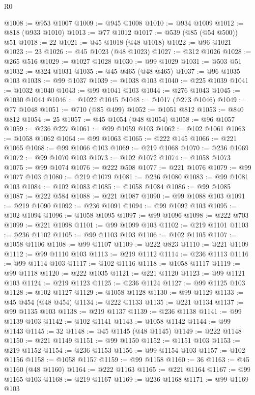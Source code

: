 \begin{lexlean}{R0}
\begin{coremodule}
@1008 := @953 @1007
@1009 := @945 @1008
@1010 := @934 @1009
@1012 := @818 (@933 @1010)
@1013 := @77 @1012
@1017 := @539 (@85 (@54 @500)) @51
@1018 := 22
@1021 := @45 @1018 (@48 @1018)
@1022 := @96 @1021
@1023 := 23
@1026 := @45 @1023 (@48 @1023)
@1027 := @312 @1026
@1028 := @265 @516
@1029 := @1027 @1028
@1030 := @99 @1029
@1031 := @503 @51
@1032 := @324 @1031
@1035 := @45 @465 (@48 @465)
@1037 := @96 @1035 @103
@1038 := @99 @1037
@1039 := @1038 @103
@1040 := @225 @1039
@1041 := @1032 @1040
@1043 := @99 @1041 @103
@1044 := @276 @1043
@1045 := @1030 @1044
@1046 := @1022 @1045
@1048 := @1017 (@273 @1046)
@1049 := @77 @1048
@1051 := @710 (@85 @499)
@1052 := @1051 @812
@1053 := @840 @812
@1054 := 25
@1057 := @45 @1054 (@48 @1054)
@1058 := @96 @1057
@1059 := @236 @227
@1061 := @99 @1059 @103
@1062 := @102 @1061
@1063 := @1058 @1062
@1064 := @99 @1063
@1065 := @222 @145
@1066 := @221 @1065
@1068 := @99 @1066 @103
@1069 := @219 @1068
@1070 := @236 @1069
@1072 := @99 @1070 @103
@1073 := @102 @1072
@1074 := @1058 @1073
@1075 := @99 @1074
@1076 := @222 @508
@1077 := @221 @1076
@1079 := @99 @1077 @103
@1080 := @219 @1079
@1081 := @236 @1080
@1083 := @99 @1081 @103
@1084 := @102 @1083
@1085 := @1058 @1084
@1086 := @99 @1085
@1087 := @222 @584
@1088 := @221 @1087
@1090 := @99 @1088 @103
@1091 := @219 @1090
@1092 := @236 @1091
@1094 := @99 @1092 @103
@1095 := @102 @1094
@1096 := @1058 @1095
@1097 := @99 @1096
@1098 := @222 @703
@1099 := @221 @1098
@1101 := @99 @1099 @103
@1102 := @219 @1101
@1103 := @236 @1102
@1105 := @99 @1103 @103
@1106 := @102 @1105
@1107 := @1058 @1106
@1108 := @99 @1107
@1109 := @222 @823
@1110 := @221 @1109
@1112 := @99 @1110 @103
@1113 := @219 @1112
@1114 := @236 @1113
@1116 := @99 @1114 @103
@1117 := @102 @1116
@1118 := @1058 @1117
@1119 := @99 @1118
@1120 := @222 @1035
@1121 := @221 @1120
@1123 := @99 @1121 @103
@1124 := @219 @1123
@1125 := @236 @1124
@1127 := @99 @1125 @103
@1128 := @102 @1127
@1129 := @1058 @1128
@1130 := @99 @1129
@1133 := @45 @454 (@48 @454)
@1134 := @222 @1133
@1135 := @221 @1134
@1137 := @99 @1135 @103
@1138 := @219 @1137
@1139 := @236 @1138
@1141 := @99 @1139 @103
@1142 := @102 @1141
@1143 := @1058 @1142
@1144 := @99 @1143
@1145 := 32
@1148 := @45 @1145 (@48 @1145)
@1149 := @222 @1148
@1150 := @221 @1149
@1151 := @99 @1150
@1152 := @1151 @103
@1153 := @219 @1152
@1154 := @236 @1153
@1156 := @99 @1154 @103
@1157 := @102 @1156
@1158 := @1058 @1157
@1159 := @99 @1158
@1160 := 36
@1163 := @45 @1160 (@48 @1160)
@1164 := @222 @1163
@1165 := @221 @1164
@1167 := @99 @1165 @103
@1168 := @219 @1167
@1169 := @236 @1168
@1171 := @99 @1169 @103

\end{coremodule}
\end{lexlean}
